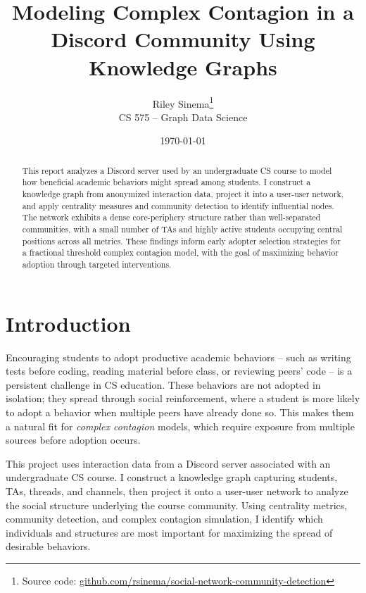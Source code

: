 \documentclass[12pt]{article}
\title{Modeling Complex Contagion in a Discord Community Using Knowledge Graphs}
\author{Riley Sinema\footnote{Source code: \href{https://github.com/rsinema/social-network-community-detection}{github.com/rsinema/social-network-community-detection}} \\ CS 575 -- Graph Data Science}
\date{\today}
\begin{document}
\maketitle

\begin{abstract}
This report analyzes a Discord server used by an undergraduate CS course to model how beneficial academic behaviors might spread among students. I construct a knowledge graph from anonymized interaction data, project it into a user-user network, and apply centrality measures and community detection to identify influential nodes. The network exhibits a dense core-periphery structure rather than well-separated communities, with a small number of TAs and highly active students occupying central positions across all metrics. These findings inform early adopter selection strategies for a fractional threshold complex contagion model, with the goal of maximizing behavior adoption through targeted interventions.
\end{abstract}

\section{Introduction}

Encouraging students to adopt productive academic behaviors -- such as writing tests before coding, reading material before class, or reviewing peers' code -- is a persistent challenge in CS education. These behaviors are not adopted in isolation; they spread through social reinforcement, where a student is more likely to adopt a behavior when multiple peers have already done so. This makes them a natural fit for \textit{complex contagion} models, which require exposure from multiple sources before adoption occurs.

This project uses interaction data from a Discord server associated with an undergraduate CS course. I construct a knowledge graph capturing students, TAs, threads, and channels, then project it onto a user-user network to analyze the social structure underlying the course community. Using centrality metrics, community detection, and complex contagion simulation, I identify which individuals and structures are most important for maximizing the spread of desirable behaviors.

\end{document}
